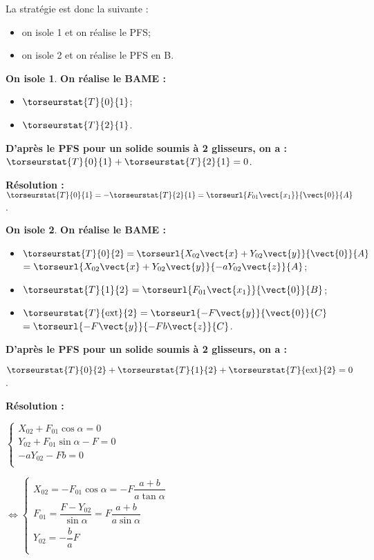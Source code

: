 La stratégie est donc la suivante : 
\begin{itemize}
\item on isole 1 et on réalise le PFS; 
\item on isole 2 et on réalise le PFS en B. 
\end{itemize} 
\else
\fi


\ifprof


\textbf{On isole 1}.
\textbf{On réalise le BAME :}
\begin{itemize}
\item $\torseurstat{T}{0}{1}$;
\item $\torseurstat{T}{2}{1}$.
\end{itemize}
\textbf{D'après le PFS pour un solide soumis à 2 glisseurs, on a : }
$\torseurstat{T}{0}{1} + \torseurstat{T}{2}{1} = {0}$. 

\textbf{Résolution :} 
$ \torseurstat{T}{0}{1} = -\torseurstat{T}{2}{1}  = \torseurl{F_{01}\vect{x_1}}{\vect{0}}{A}$.

\vspace{1cm}

\textbf{On isole 2}.
\textbf{On réalise le BAME :}
\begin{itemize}
\item $\torseurstat{T}{0}{2} =\torseurl{X_{02}\vect{x} +Y_{02}\vect{y}  }{\vect{0}}{A} $ $=\torseurl{X_{02}\vect{x} +Y_{02}\vect{y}  }{-aY_{02}\vect{z}}{A} $;
\item $\torseurstat{T}{1}{2} = \torseurl{F_{01}\vect{x_1}  }{\vect{0}}{B} $;
\item $\torseurstat{T}{\text{ext}}{2} = \torseurl{-F\vect{y}  }{\vect{0}}{C} $ $= \torseurl{-F\vect{y}  }{-Fb\vect{z}}{C}$.
\end{itemize}
\textbf{D'après le PFS pour un solide soumis à 2 glisseurs, on a : }

$\torseurstat{T}{0}{2} + \torseurstat{T}{1}{2}+\torseurstat{T}{\text{ext}}{2} = {0}$.

 \textbf{Résolution :}

$\left\{ \begin{array}{l}
X_{02}+F_{01}\cos\alpha  = 0 \\
Y_{02}+F_{01}\sin\alpha  -F= 0 \\
-aY_{02}-Fb  = 0 \\
\end{array}
\right.$


$
\Leftrightarrow 
\left\{ \begin{array}{l}
X_{02}=-F_{01}\cos\alpha  =-F\dfrac{a+b}{a\tan\alpha} \\
F_{01}  =\dfrac{F-Y_{02}}{\sin\alpha}=F\dfrac{a+b}{a\sin\alpha} \\
Y_{02} = -\dfrac{b}{a}F  \\
\end{array}
\right.$


